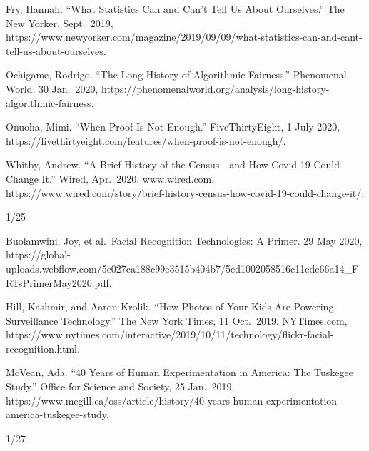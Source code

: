 \documentclass[
]{article}
\newlength{\cslhangindent}
\newlength{\cslentryspacingunit} %
\newenvironment{CSLReferences}[2] %
 {%
  \setlength{\parindent}{0pt}
  \ifodd #1
  \let\oldpar\par
  \def\par{\hangindent=\cslhangindent\oldpar}
  \fi
  \setlength{\parskip}{#2\cslentryspacingunit}
 }%
 {}
\begin{document}
\begin{CSLReferences}{0}{0}
Fry, Hannah. ``What Statistics Can and Can't Tell Us About Ourselves.''
The New Yorker, Sept.~2019,
https://www.newyorker.com/magazine/2019/09/09/what-statistics-can-and-cant-tell-us-about-ourselves.

{}

Ochigame, Rodrigo. ``The Long History of Algorithmic Fairness.''
Phenomenal World, 30 Jan.~2020,
https://phenomenalworld.org/analysis/long-history-algorithmic-fairness.

{}

Onuoha, Mimi. ``When Proof Is Not Enough.'' FiveThirtyEight, 1 July
2020, https://fivethirtyeight.com/features/when-proof-is-not-enough/.

{}

Whitby, Andrew. ``A Brief History of the Census---and How Covid-19 Could
Change It.'' Wired, Apr.~2020. www.wired.com,
https://www.wired.com/story/brief-history-census-how-covid-19-could-change-it/.

{}

\end{CSLReferences}

1/25

\begin{CSLReferences}{0}{0}
Buolamwini, Joy, et al.~Facial Recognition Technologies: A Primer. 29
May 2020,
https://global-uploads.webflow.com/5e027ca188c99e3515b404b7/5ed1002058516c11edc66a14\_FRTsPrimerMay2020.pdf.

{}

Hill, Kashmir, and Aaron Krolik. ``How Photos of Your Kids Are Powering
Surveillance Technology.'' The New York Times, 11 Oct.~2019.
NYTimes.com,
https://www.nytimes.com/interactive/2019/10/11/technology/flickr-facial-recognition.html.

{}

McVean, Ada. ``40 Years of Human Experimentation in America: The
Tuskegee Study.'' Office for Science and Society, 25 Jan.~2019,
https://www.mcgill.ca/oss/article/history/40-years-human-experimentation-america-tuskegee-study.

{}

\end{CSLReferences}

1/27
\end{document}
